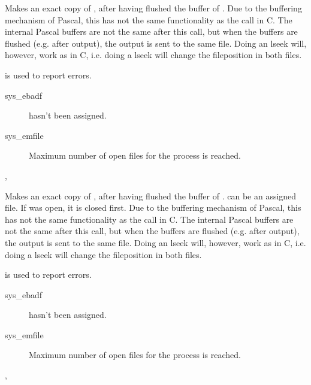 {
Makes  an exact copy of , after having flushed the
buffer of . Due to the buffering mechanism of Pascal, this has not
the same functionality as the  call in C. The internal Pascal
buffers are not the same after this call, but when the buffers are flushed
(e.g. after output), the output is sent to the same file.
Doing an lseek will, however, work as in C, i.e. doing a lseek will change the
fileposition in both files.
}
{  is used to report errors.
\begin{description}
\item[sys\_ebadf]  hasn't been assigned.
\item[sys\_emfile] Maximum number of open files for the process is reached.
\end{description}
}
{,  }



{
Makes  an exact copy of , after having flushed the
buffer of .  can be an assigned file.
If  was open, it is closed first.
Due to the buffering mechanism of Pascal, this has not
the same functionality as the  call in C. The internal Pascal
buffers are not the same after this call, but when the buffers are flushed
(e.g. after output), the output is sent to the same file.
Doing an lseek will, however, work as in C, i.e. doing a lseek will change the
fileposition in both files.
}
{  is used to report errors.
\begin{description}
\item[sys\_ebadf]  hasn't been assigned.
\item[sys\_emfile] Maximum number of open files for the process is reached.
\end{description}
}
{ ,  }



